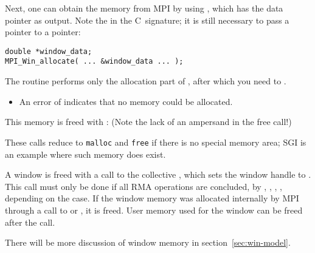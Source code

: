 Next, one can obtain the memory from MPI by using
,
which has the data pointer as output. Note the  in the
C~signature; it is still necessary to pass a pointer to a pointer:
\begin{lstlisting}
double *window_data;
MPI_Win_allocate( ... &window_data ... );
\end{lstlisting}
The routine  performs only the allocation
part of , after which you need to
.
\begin{itemize}
\item
  An error of  indicates that
  no memory could be allocated.
\end{itemize}

This memory is freed with :
(Note the lack of an ampersand in the free call!)

These calls reduce to \lstinline{malloc} and \lstinline{free} if there is no special
memory area; SGI is an example where such memory does exist.

A window is freed with a call to the collective ,
which sets the window handle to .
This call must only be done if all \ac{RMA} operations are concluded,
by , , ,
, depending on the case.
If the window memory was allocated internally by MPI through a call to
 or ,
it is freed.
User memory used for the window can be freed after the  call.

There will be more discussion of window memory in section~\ref{sec:win-model}.


